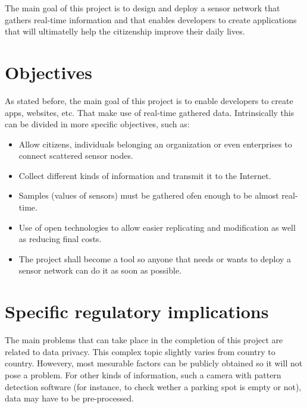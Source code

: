 The main goal of this project is to design and deploy a sensor network that gathers real-time information and that enables developers to create applications that will ultimatelly help the citizenship improve their daily lives.

\section{Objectives}

As stated before, the main goal of this project is to enable developers to create apps, websites, etc. That make use of real-time gathered data. Intrinsically this can be divided in more specific objectives, such as:

\begin{itemize}
    \item Allow citizens, individuals belonging an organization or even enterprises to connect scattered sensor nodes.
    \item Collect different kinds of information and transmit it to the Internet.
    \item Samples (values of sensors) must be gathered ofen enough to be almost real-time.
    \item Use of open technologies to allow easier replicating and modification as well as reducing final costs.
    \item The project shall become a tool so anyone that needs or wants to deploy a sensor network can do it as soon as possible.
\end{itemize}

\section{Specific regulatory implications}

The main problems that can take place in the completion of this project are related to data privacy. This complex topic slightly varies from country to country. Howevery, most mesurable factors can be publicly obtained so it will not pose a problem. For other kinds of information, such a camera with pattern detection software (for instance, to check wether a parking spot is empty or not), data may have to be pre-processed.


